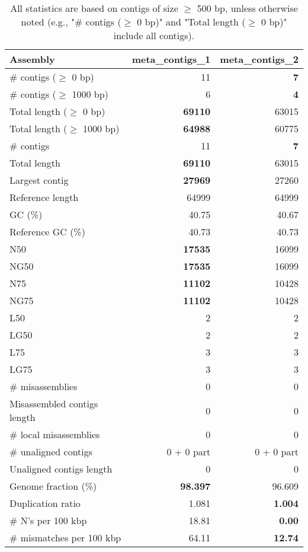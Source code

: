 \documentclass[12pt,a4paper]{article}
\begin{document}
\begin{table}[ht]
\begin{center}
\caption{All statistics are based on contigs of size $\geq$ 500 bp, unless otherwise noted (e.g., "\# contigs ($\geq$ 0 bp)" and "Total length ($\geq$ 0 bp)" include all contigs).}
\begin{tabular}{|l*{2}{|r}|}
\hline
Assembly & meta\_contigs\_1 & meta\_contigs\_2 \\ \hline
\# contigs ($\geq$ 0 bp) & 11 & {\bf 7} \\ \hline
\# contigs ($\geq$ 1000 bp) & 6 & {\bf 4} \\ \hline
Total length ($\geq$ 0 bp) & {\bf 69110} & 63015 \\ \hline
Total length ($\geq$ 1000 bp) & {\bf 64988} & 60775 \\ \hline
\# contigs & 11 & {\bf 7} \\ \hline
Total length & {\bf 69110} & 63015 \\ \hline
Largest contig & {\bf 27969} & 27260 \\ \hline
Reference length & 64999 & 64999 \\ \hline
GC (\%) & 40.75 & 40.67 \\ \hline
Reference GC (\%) & 40.73 & 40.73 \\ \hline
N50 & {\bf 17535} & 16099 \\ \hline
NG50 & {\bf 17535} & 16099 \\ \hline
N75 & {\bf 11102} & 10428 \\ \hline
NG75 & {\bf 11102} & 10428 \\ \hline
L50 & 2 & 2 \\ \hline
LG50 & 2 & 2 \\ \hline
L75 & 3 & 3 \\ \hline
LG75 & 3 & 3 \\ \hline
\# misassemblies & 0 & 0 \\ \hline
Misassembled contigs length & 0 & 0 \\ \hline
\# local misassemblies & 0 & 0 \\ \hline
\# unaligned contigs & 0 + 0 part & 0 + 0 part \\ \hline
Unaligned contigs length & 0 & 0 \\ \hline
Genome fraction (\%) & {\bf 98.397} & 96.609 \\ \hline
Duplication ratio & 1.081 & {\bf 1.004} \\ \hline
\# N's per 100 kbp & 18.81 & {\bf 0.00} \\ \hline
\# mismatches per 100 kbp & 64.11 & {\bf 12.74} \\ \hline

\end{tabular}
\end{center}
\end{table}
\end{document}
